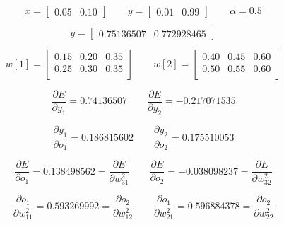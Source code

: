 \begin{equation*}
    x = \begin{bmatrix}
            0.05 & 0.10
        \end{bmatrix}
    \qquad
    y = \begin{bmatrix}
            0.01 & 0.99
        \end{bmatrix}
    \qquad
    \alpha = 0.5
\end{equation*}

\begin{equation*}
    \overline{y} = \begin{bmatrix}
                       0.75136507 & 0.772928465
                   \end{bmatrix}
\end{equation*}

\begin{equation*}
    w[1] = \begin{bmatrix}
               0.15 & 0.20 & 0.35 \\
               0.25 & 0.30 & 0.35 \\
           \end{bmatrix}
    \qquad
    w[2] = \begin{bmatrix}
               0.40 & 0.45 & 0.60 \\
               0.50 & 0.55 & 0.60 \\
           \end{bmatrix}
\end{equation*}

\begin{equation*}
    \frac{\partial E}{\partial \overline{y_1}} = 0.74136507
    \qquad 
    \frac{\partial E}{\partial \overline{y_2}} = -0.217071535
\end{equation*}

\begin{equation*}
    \frac{\partial \overline{y_1}}{\partial \overline{o_1}} = 0.186815602
    \qquad 
    \frac{\partial \overline{y_2}}{\partial \overline{o_2}} = 0.175510053
\end{equation*}

\begin{equation*}
    \frac{\partial E}{\partial o_1} = 0.138498562 = \frac{\partial E}{\partial w_{31}^2}
    \qquad 
    \frac{\partial E}{\partial o_2} = -0.038098237 = \frac{\partial E}{\partial w_{32}^2}
\end{equation*}

\begin{equation*}
    \frac{\partial o_1}{\partial w_{11}^2} = 0.593269992 = \frac{\partial o_2}{\partial w_{12}^2}
    \qquad 
    \frac{\partial o_1}{\partial w_{21}^2} = 0.596884378 = \frac{\partial o_2}{\partial w_{22}^2}
\end{equation*}

